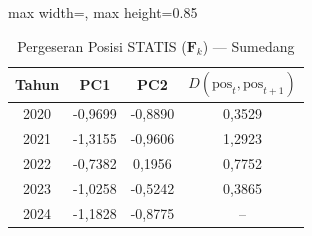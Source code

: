 \begin{table}[H]
\centering
\caption{Pergeseran Posisi STATIS ($\mathbf{F}_k$) --- Sumedang} \label{tab:app2jarak_statis_skor_sumedang}
\begin{adjustbox}{max width=\textwidth, max height=0.85\textheight}
\begin{tabular}{|c|c|c|c|}
\hline
\textbf{Tahun} & \textbf{PC1} & \textbf{PC2} & \textbf{$D(\text{pos}_t, \text{pos}_{t+1})$} \\
\hline
2020 & -0,9699 & -0,8890 & 0,3529 \\
2021 & -1,3155 & -0,9606 & 1,2923 \\
2022 & -0,7382 & 0,1956 & 0,7752 \\
2023 & -1,0258 & -0,5242 & 0,3865 \\
2024 & -1,1828 & -0,8775 & -- \\
\hline
\end{tabular}
\end{adjustbox}
\end{table}